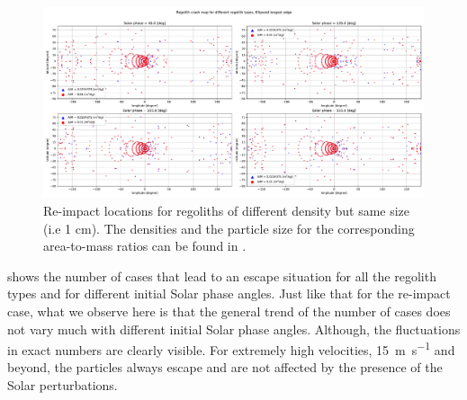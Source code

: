 \begin{figure}[htb]
\centering
\captionsetup{justification=centering}
\includegraphics[angle=90, width=\textwidth, height=\textheight, keepaspectratio=true]{longest_edge_perturbations/multiple_regolith_types/allPhases_crashMap_3P2_7P5_density_1cm_Radius.pdf}
\caption{Re-impact locations for regoliths of different density but same size (i.e 1 cm). The densities and the particle size for the corresponding area-to-mass ratios can be found in .}
\label{fig:crashmap_3.2_7.5_density_1cmRadius}
\end{figure}
\FloatBarrier
 shows the number of cases that lead to an escape situation for all the regolith types and for different initial Solar phase angles. Just like that for the re-impact case, what we observe here is that the general trend of the number of cases does not vary much with different initial Solar phase angles. Although, the fluctuations in exact numbers are clearly visible. For extremely high velocities, \SI{15}{\metre\per\second} and beyond, the particles always escape and are not affected by the presence of the Solar perturbations.
%
\newline\newline
%
